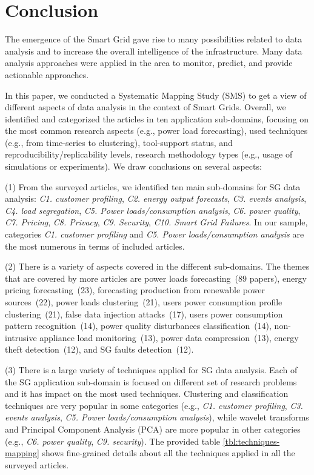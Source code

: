 \documentclass[journal]{IEEEtran}
\begin{document}



\section{Conclusion}

The emergence of the Smart Grid gave rise to many possibilities related to data analysis and to increase the overall intelligence of the infrastructure. Many data analysis approaches were applied in the area to monitor, predict, and provide actionable approaches.

In this paper, we conducted a Systematic Mapping Study (SMS) to get a view of different aspects of data analysis in the context of Smart Grids. Overall, we identified and categorized the articles in ten application sub-domains, focusing on the most common research aspects (e.g., power load forecasting), used techniques (e.g., from time-series to clustering), tool-support status, and reproducibility/replicability levels, research methodology types (e.g., usage of simulations or experiments). We draw conclusions on several aspects:

\noindent (1) From the surveyed articles, we identified ten main sub-domains for SG data analysis: \textit{C1. customer profiling}, \textit{C2. energy output forecasts}, \textit{C3. events analysis}, \textit{C4. load segregation}, \textit{C5. Power loads/consumption analysis}, \textit{C6. power quality}, \textit{C7. Pricing}, \textit{C8. Privacy}, \textit{C9. Security}, \textit{C10. Smart Grid Failures}. In our sample, categories \textit{C1. customer profiling} and \textit{C5. Power loads/consumption analysis} are the most numerous in terms of included articles.

\noindent (2) There is a variety of aspects covered in the different sub-domains. The themes that are covered by more articles are power loads forecasting~(89 papers), energy pricing forecasting~(23), forecasting production from renewable power sources~(22), power loads clustering~(21), users power consumption profile clustering~(21), false data injection attacks~(17), users power consumption pattern recognition~(14), power quality disturbances classification~(14), non-intrusive appliance load monitoring~(13), power data compression~(13), energy theft detection~(12), and SG faults detection~(12).

\noindent (3) There is a large variety of techniques applied for SG data analysis. Each of the SG application sub-domain is focused on different set of research problems and it has impact on the most used techniques. Clustering and classification techniques are very popular in some categories (e.g., \textit{C1. customer profiling}, \textit{C3. events analysis}, \textit{C5. Power loads/consumption analysis}), while wavelet transforms and Principal Component Analysis (PCA) are more popular in other categories (e.g., \textit{C6. power quality}, \textit{C9. security}). The provided table \ref{tbl:techniques-mapping} shows fine-grained details about all the techniques applied in all the surveyed articles.
\end{document}
